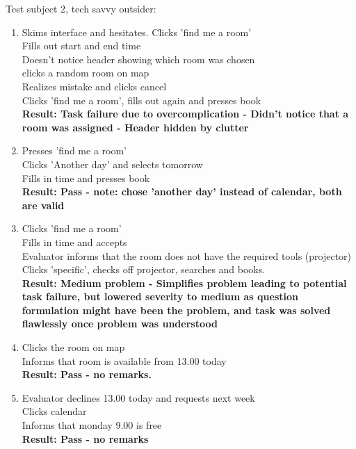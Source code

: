 Test subject 2, tech savvy outsider:
\begin{enumerate}
\item Skims interface and hesitates. Clicks 'find me a room' \\
Fills out start and end time \\
Doesn't notice header showing which room was chosen \\
clicks a random room on map \\
Realizes mistake and clicks cancel \\
Clicks 'find me a room', fills out again and presses book \\
\textbf{Result: Task failure due to overcomplication - Didn't notice that a room was assigned - Header hidden by clutter}
\item Presses 'find me a room' \\
Clicks 'Another day' and selects tomorrow \\
Fills in time and presses book \\
\textbf{Result: Pass - note: chose 'another day' instead of calendar, both are valid}
\item Clicks 'find me a room' \\
Fills in time and accepts \\
Evaluator informs that the room does not have the required tools (projector) \\
Clicks 'specific', checks off projector, searches and books. \\
\textbf{Result: Medium problem - Simplifies problem leading to potential task failure, but lowered severity to medium as question formulation might have been the problem, and task was solved flawlessly once problem was understood}
\item Clicks the room on map \\
Informs that room is available from 13.00 today \\
\textbf{Result: Pass - no remarks.}
\item Evaluator declines 13.00 today and requests next week \\
Clicks calendar \\
Informs that monday 9.00 is free \\
\textbf{Result: Pass - no remarks}
\end{enumerate}

